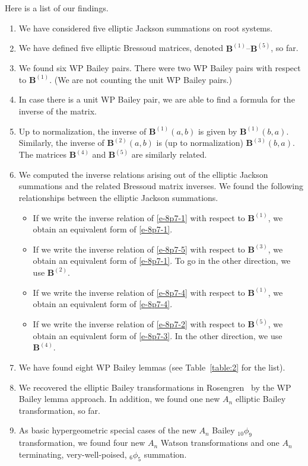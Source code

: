 \documentclass[pdftex]{sigma}
\numberwithin{equation}{section}
\newcommand{\B}{{ \mathbf B}}
\begin{document}
Here is a list of our findings.
\begin{enumerate}\itemsep=0pt
\item We have considered five elliptic Jackson summations on root systems.
\item We have defined five elliptic Bressoud matrices, denoted $\B^{(1)}$--$\B^{(5)}$, so far.
\item We found six WP Bailey pairs. There were two WP Bailey pairs with respect to $\B^{(1)}$. (We are not counting the unit WP Bailey pairs.)
\item In case there is a unit WP Bailey pair, we are able to find a formula for the inverse of the matrix.
\item Up to normalization, the inverse of $\B^{(1)}(a,b)$ is given by $\B^{(1)}(b,a)$. Similarly, the inverse of $\B^{(2)}(a,b)$ is (up to normalization) $\B^{(3)}(b,a)$. The matrices $\B^{(4)}$ and $\B^{(5)}$ are similarly related.
\item We computed the inverse relations arising out of the elliptic Jackson summations and the related Bressoud matrix inverses. We found the following relationships between the elliptic Jackson summations.
\begin{itemize}\itemsep=0pt
\item If we write the inverse relation of \eqref{e-8p7-1} with respect to $\B^{(1)}$, we obtain an equivalent form of \eqref{e-8p7-1}.
\item If we write the inverse relation of \eqref{e-8p7-5} with respect to $\B^{(3)}$, we obtain an equivalent form of \eqref{e-8p7-1}. To go in the other direction, we use $\B^{(2)}$.
\item If we write the inverse relation of \eqref{e-8p7-4} with respect to $\B^{(1)}$, we obtain an equivalent form of \eqref{e-8p7-4}.
\item If we write the inverse relation of \eqref{e-8p7-2} with respect to $\B^{(5)}$, we obtain an equivalent form of \eqref{e-8p7-3}. In the other direction, we use $\B^{(4)}$.
\end{itemize}
\item We have found eight WP Bailey lemmas (see Table~\ref{table:2} for the list).
\item We recovered the elliptic Bailey transformations in Rosengren~\cite{HR2004} by the WP Bailey lemma approach. In addition, we found one new $A_n$ elliptic Bailey transformation, so far.
\item As basic hypergeometric special cases of the new $A_n$ Bailey $_{10}\phi_9$ transformation, we found four new $A_n$ Watson transformations and one $A_n$ terminating, very-well-poised, $_6\phi_5$ summation.
\end{enumerate}
\end{document}
